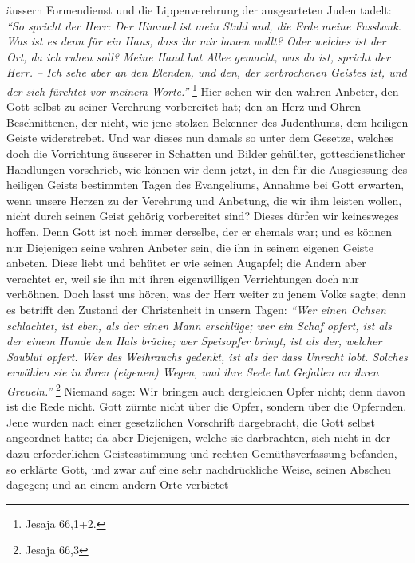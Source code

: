 äussern Formendienst und
die Lippenverehrung der ausgearteten Juden tadelt:
\textit{"`So spricht der Herr: Der
Himmel ist mein Stuhl und, die Erde meine Fussbank. Was ist es denn für ein
Haus, dass ihr mir hauen wollt? Oder welches ist der Ort, da ich ruhen soll?
Meine Hand hat Allee gemacht, was da ist, spricht der Herr. -- Ich sehe aber an
den Elenden, und den, der zerbrochenen Geistes ist, und der sich fürchtet vor
meinem Worte."'}
\footnote{Jesaja 66,1+2.}
Hier sehen wir den wahren Anbeter, den
Gott selbst zu seiner Verehrung vorbereitet hat; den an Herz und Ohren
Beschnittenen, der nicht, wie jene stolzen Bekenner des
Judenthums, dem
heiligen Geiste widerstrebet. Und war dieses nun damals
so unter dem Gesetze, welches doch die Vorrichtung äusserer
in Schatten und
Bilder gehüllter, gottesdienstlicher Handlungen vorschrieb, wie können wir denn
jetzt, in den für die Ausgiessung des heiligen Geists bestimmten Tagen des
Evangeliums, Annahme bei Gott erwarten, wenn unsere Herzen
zu der Verehrung und
Anbetung, die wir ihm leisten wollen, nicht durch seinen Geist gehörig
vorbereitet sind? Dieses dürfen wir keinesweges hoffen. Denn Gott ist noch immer
derselbe, der er ehemals war; und es können nur
Diejenigen seine wahren Anbeter sein, die ihn in seinem
eigenen Geiste anbeten.
Diese liebt und behütet er wie seinen Augapfel; die Andern aber verachtet er,
weil sie ihn mit ihren eigenwilligen Verrichtungen doch nur verhöhnen. Doch
lasst uns hören, was der Herr weiter zu jenem Volke sagte; denn es betrifft den
Zustand der Christenheit in unsern Tagen:
\textit{"`Wer einen Ochsen schlachtet, ist
eben, als der einen Mann erschlüge; wer ein Schaf opfert, ist als der einem
Hunde den Hals bräche; wer Speisopfer bringt, ist als der, welcher Saublut
opfert. Wer des Weihrauchs gedenkt, ist als der
dass Unrecht lobt. Solches erwählen sie in ihren (eigenen) Wegen, und ihre Seele
hat Gefallen an ihren Greueln."'}
\footnote{Jesaja 66,3}
Niemand sage: Wir bringen
auch dergleichen Opfer nicht; denn davon ist die Rede nicht. Gott zürnte nicht
über die Opfer, sondern über die Opfernden. Jene wurden nach einer gesetzlichen
Vorschrift dargebracht, die Gott selbst angeordnet hatte; da aber Diejenigen,
welche sie darbrachten, sich nicht in der dazu erforderlichen Geistesstimmung
und rechten Gemüthsverfassung befanden, so erklärte Gott, und zwar auf eine sehr
nachdrückliche Weise, seinen Abscheu dagegen; und an einem andern Orte verbietet
